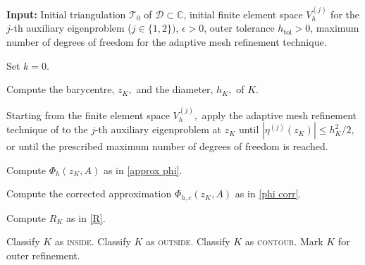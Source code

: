 \begin{algorithm}[ht]
\caption{Coupled Inner and Outer Adaptivity for Computing Pseudospectra}
\label{outerloop}

\textbf{Input:} Initial triangulation $\mathcal{T}_0$ of $\mathcal{D}\subset\mathbb{C}$, initial finite element space $V_h^{(j)}$ for the $j$-th auxiliary eigenproblem ($j \in \{1, 2\})$,
$\epsilon>0$, outer tolerance $h_{\mathrm{tol}}>0$, maximum number of degrees of freedom for the adaptive mesh refinement technique. 

\begin{algorithmic}[1]

    \State Set $k=0$.



            \State Compute the barycentre, $z_K,$ and the diameter, $h_K,$ of $K.$ 
        
                \State \parbox[t]{0.82\linewidth}{
                    Starting from the finite element space $V_h^{(j)},$ apply the adaptive mesh refinement technique of 
                    to the $j$-th auxiliary eigenproblem at $z_K$ until
                        $|\eta^{(j)}(z_K)| \leq h_K^2/2,$
                    or until the prescribed maximum number of degrees of freedom
                    is reached.
                } 
                \newline{}
                \EndFor
    
            \State Compute
                $ \Phi_h(z_K,A) $ as in \eqref{approx phi}.

            \State Compute the corrected approximation $\Phi_{h,c}(z_K,A)$ as in \eqref{phi corr}.
            

            \State Compute $R_K$ as in \eqref{R}.

                \State Classify $K$ as \textsc{inside}.
                \State Classify $K$ as \textsc{outside}.
                \State Classify $K$ as \textsc{contour}.
            \Else
                \State Mark $K$ for outer refinement.
            \EndIf


\end{algorithmic}
\end{algorithm}
